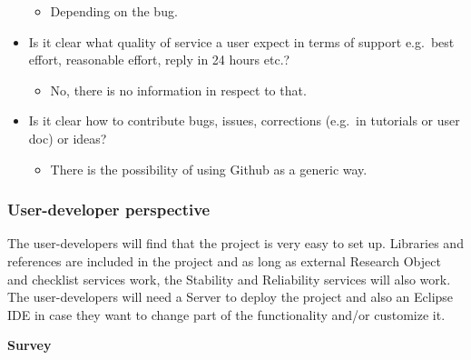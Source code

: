 \begin{itemize}
  \begin{itemize}
  \itemsep1pt\parskip0pt
  \item
    Depending on the bug.
  \end{itemize}
\item
  Is it clear what quality of service a user expect in terms of support
  e.g.~best effort, reasonable effort, reply in 24 hours etc.?

  \begin{itemize}
  \itemsep1pt\parskip0pt
  \item
    No, there is no information in respect to that.
  \end{itemize}
\item
  Is it clear how to contribute bugs, issues, corrections (e.g.~in
  tutorials or user doc) or ideas?

  \begin{itemize}
  \itemsep1pt\parskip0pt
  \item
    There is the possibility of using Github as a generic way.
  \end{itemize}
\end{itemize}

\subsubsection{User-developer perspective}

The user-developers will find that the project is very easy to set up.
Libraries and references are included in the project and as long as
external Research Object and checklist services work, the Stability and
Reliability services will also work. The user-developers will need a
Server to deploy the project and also an Eclipse IDE in case they want
to change part of the functionality and/or customize it.

\textbf{Survey}

